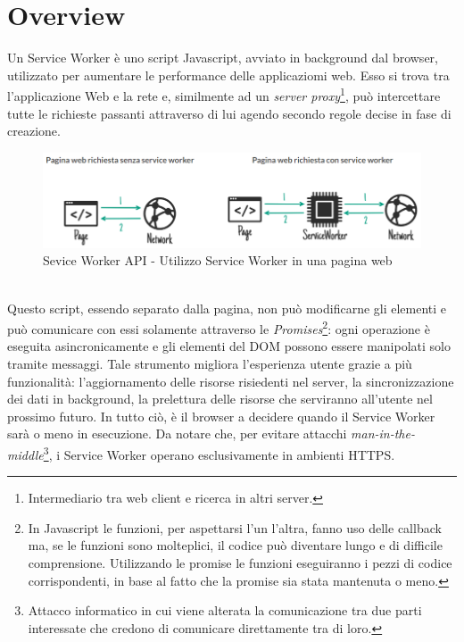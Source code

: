 \documentclass[12pt ,a4paper , twoside , openright ]{book}
\begin{document}
	\section{Overview}
	Un Service Worker\cite{rif25} è uno script Javascript, avviato in background dal browser, utilizzato per aumentare le performance delle applicaziomi web. Esso si trova tra l'applicazione Web e la rete e, similmente ad un \textit{server proxy}\footnote{Intermediario tra web client e ricerca in altri server.}, può intercettare tutte le richieste passanti attraverso di lui agendo secondo regole decise in fase di creazione\cite{rif24}.
	\begin{figure}[h]
		\centering
		\includegraphics[width=\linewidth]{PaginaSW}
		\caption{Sevice Worker API - Utilizzo Service Worker in una pagina web\cite{rif24}}
		\label{Sevice Worker API - Utilizzo Service Worker in una pagina web}
	\end{figure} \\
	Questo script, essendo separato dalla pagina, non può modificarne gli elementi e può comunicare con essi solamente attraverso le \textit{Promises}\footnote{In Javascript le funzioni, per aspettarsi l'un l'altra, fanno uso delle callback ma, se le funzioni sono molteplici, il codice può diventare lungo e di difficile comprensione. Utilizzando le promise le funzioni eseguiranno i pezzi di codice corrispondenti, in base al fatto che la promise sia stata mantenuta o meno.}: ogni operazione è eseguita asincronicamente e gli elementi del DOM possono essere manipolati solo tramite messaggi. Tale strumento migliora l'esperienza utente grazie a più funzionalità: l'aggiornamento  delle risorse risiedenti nel server, la sincronizzazione dei dati in background, la prelettura delle risorse che serviranno all'utente nel prossimo futuro. In tutto ciò, è il browser a decidere quando il Service Worker sarà o meno in esecuzione. Da notare che, per evitare attacchi \textit{man-in-the-middle}\footnote{Attacco informatico in cui viene alterata la comunicazione tra due parti interessate che credono di comunicare direttamente tra di loro.}, i Service Worker operano esclusivamente in ambienti HTTPS. 
	
\end{document}
